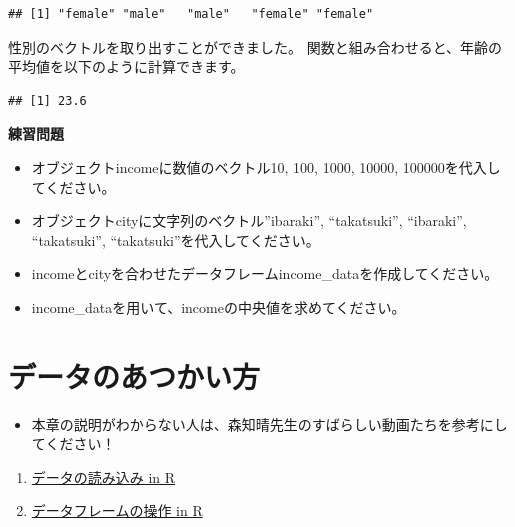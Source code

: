 \documentclass[
]{book}
\newenvironment{Shaded}{\begin{snugshade}}{\end{snugshade}}
\newcommand{\FunctionTok}[1]{\textcolor[rgb]{0.00,0.00,0.00}{#1}}
\newcommand{\NormalTok}[1]{#1}
\newcommand{\SpecialCharTok}[1]{\textcolor[rgb]{0.00,0.00,0.00}{#1}}
\providecommand{\tightlist}{%
  \setlength{\itemsep}{0pt}\setlength{\parskip}{0pt}}
\begin{document}
\begin{verbatim}
## [1] "female" "male"   "male"   "female" "female"
\end{verbatim}

性別のベクトルを取り出すことができました。 関数と組み合わせると、年齢の平均値を以下のように計算できます。

\begin{Shaded}
\end{Shaded}

\begin{verbatim}
## [1] 23.6
\end{verbatim}

\textbf{練習問題}

\begin{itemize}
\tightlist
\item
  オブジェクトincomeに数値のベクトル10, 100, 1000, 10000, 100000を代入してください。\\
\item
  オブジェクトcityに文字列のベクトル''ibaraki'', ``takatsuki'', ``ibaraki'', ``takatsuki'', ``takatsuki''を代入してください。\\
\item
  incomeとcityを合わせたデータフレームincome\_dataを作成してください。\\
\item
  income\_dataを用いて、incomeの中央値を求めてください。
\end{itemize}

\hypertarget{ux30c7ux30fcux30bfux306eux3042ux3064ux304bux3044ux65b9}{%
\chapter{データのあつかい方}\label{ux30c7ux30fcux30bfux306eux3042ux3064ux304bux3044ux65b9}}

\begin{itemize}
\tightlist
\item
  本章の説明がわからない人は、森知晴先生のすばらしい動画たちを参考にしてください！
\end{itemize}

\begin{enumerate}
\def\labelenumi{\arabic{enumi}.}
\tightlist
\item
  \href{https://youtu.be/FugazO_rL7c}{データの読み込み in R}\\
\item
  \href{https://youtu.be/96AZJmGNass}{データフレームの操作 in R}
\end{enumerate}
\end{document}
